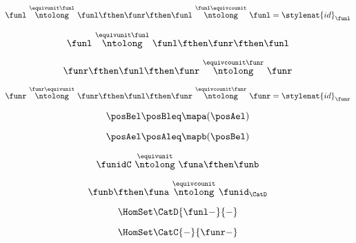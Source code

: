 {\begin{forslides}
    \begin{equation}
        \label{eq:slides_adjunctions_53b}
        \funl \ \overset{\equivunit \funl }{\ntolong}\ \funl \fthen \funr  \fthen \funl \ \overset{\funl \equivcounit}{\ntolong}\ \funl = \stylenat{id}_\funl
    \end{equation}

    \begin{equation}
        \label{eq:slides_adjunctions_54}
        \funl \ \overset{\equivunit \funl }{\ntolong}\ \funl \fthen \funr \fthen \funl
    \end{equation}

    \begin{equation}
        \label{eq:slides_adjunctions_55}
        \funr \fthen \funl \fthen \funr  \ \overset{\equivcounit \funr}{\ntolong}\ \funr
    \end{equation}

    \begin{equation}
        \label{eq:slides_adjunctions_55b}
        \funr \ \overset{\funr\equivunit}{\ntolong}\ \funr \fthen \funl \fthen \funr  \ \overset{\equivcounit \funr}{\ntolong}\ \funr  =  \stylenat{id}_\funr
    \end{equation}

    \begin{equation}
        \label{eq:slides_adjunctions_56}
        \posBel \posBleq \mapa(\posAel)
    \end{equation}

    \begin{equation}
        \label{eq:slides_adjunctions_57}
        \posAel \posAleq \mapb(\posBel)
    \end{equation}

    \begin{equation}
        \label{eq:slides_adjunctions_58}
        \funidC \ \overset{\equivunit}{\ntolong}\ \funa \fthen \funb
    \end{equation}

    \begin{equation}
        \label{eq:slides_adjunctions_59}
        \funb \fthen \funa \ \overset{\equivcounit}{\ntolong}\ \funid_\CatD
    \end{equation}

    \begin{equation}
        \label{eq:slides_adjunctions_60}
        \HomSet\CatD{\funl -}{-}
    \end{equation}

    \begin{equation}
        \label{eq:slides_adjunctions_61}
        \HomSet\CatC{-}{\funr - }
    \end{equation}


\end{forslides}}
